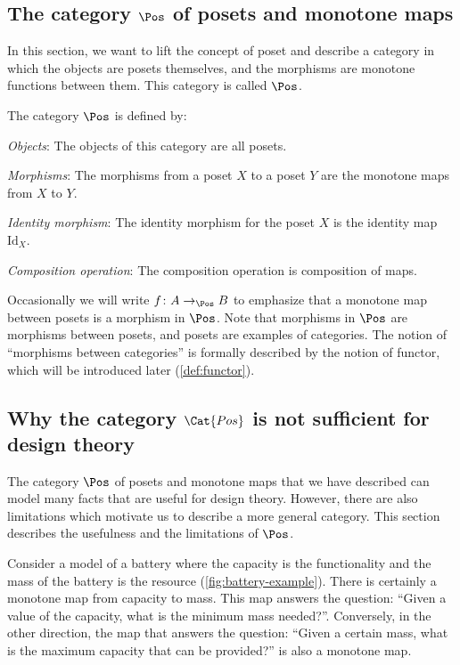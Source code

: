 \subsection{The category $\Pos$ of posets and monotone maps}
In this section, we want to lift the concept of poset and describe a category in which the objects are posets themselves, and the morphisms are monotone functions between them. This category is called $\Pos$.

\begin{definition}
    The category $\Pos$ is defined by:
    \begin{compactenum}
    \item \emph{Objects}: The objects of this category are all posets.
    \item \emph{Morphisms}: The morphisms from a poset $X$ to a poset $Y$ are the monotone maps from $X$ to $Y$.
    \item \emph{Identity morphism}:  The identity morphism for the poset $X$
    is the identity map $\text{Id}_X$.
    \item \emph{Composition operation}: The composition operation is composition of maps.
    \end{compactenum}
\end{definition}

Occasionally we will write $f \colon A \to_{\Pos} B$ to emphasize that a monotone map between posets is a morphism in $\Pos$. Note that morphisms in $\Pos$ are morphisms between posets, and posets are examples of categories. The notion of ``morphisms between categories'' is formally described by the notion of functor, which will be introduced later (\cref{def:functor}).


\subsection{Why the category $\Cat{Pos}$ is not sufficient for design theory}


The category $\Pos$ of posets and monotone maps that we have described can model many facts that are useful for design theory. However, there are also limitations which motivate us to describe a more general category. This section describes the usefulness and the limitations of $\Pos$.

\begin{example}[Battery]
Consider a model of a battery where the capacity is the functionality and the mass of the battery is the resource (\cref{fig:battery-example}). There is certainly a monotone map from capacity to mass. This map answers the question: ``Given a value of the capacity, what is the minimum mass needed?''. Conversely, in the other direction, the map that answers the question: ``Given a certain mass, what is the maximum capacity that can be provided?'' is also a monotone map.
\end{example}

